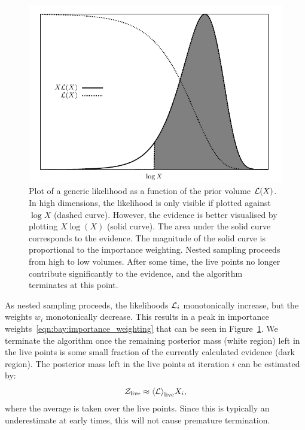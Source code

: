 %
\begin{figure}
  \centering
  \includegraphics[width=\columnwidth]{chapter_bayesian_inference/figures/gaussian_weight}
  \caption{%
    Plot of a generic likelihood as a function of the prior volume $\mathcal{L}(X)$. In high dimensions, the likelihood is only visible if plotted against $\log X$ (dashed curve). However, the evidence is better visualised by plotting $X\log(X)$ (solid curve). The area under the solid curve corresponds to the evidence. The magnitude of the solid curve is proportional to the importance weighting. Nested sampling proceeds from high to low volumes. After some time, the live points no longer contribute significantly to the evidence, and the algorithm terminates at this point.\label{fig:bay:gaussian_weight}
  }
\end{figure}
%
As nested sampling proceeds, the likelihoods $\mathcal{L}_i$ monotonically increase, but the weights $w_i$ monotonically decrease. This results in a peak in importance weights~\eqref{eqn:bay:importance_weighting} that can be seen in Figure~\ref{fig:bay:gaussian_weight}. We terminate the algorithm once the remaining posterior mass (white region) left in the live points is some small fraction of the currently calculated evidence (dark region). The posterior mass left in the live points at iteration $i$ can be estimated by:
\begin{equation}
  \mathcal{Z}_{\mathrm{live}} \approx {\left\langle{\mathcal{L}}\right\rangle}_{\mathrm{live}} X_i,
  \label{eqn:bay:live_evidence}
\end{equation}
where the average is taken over the live points. Since this is typically an underestimate at early times, this will not cause premature termination.





